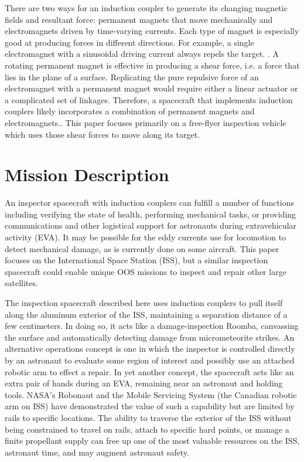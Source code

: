 \documentclass{article}
\begin{document}
There are two ways for an induction coupler to generate its changing magnetic fields and resultant force: permanent magnets that move mechanically and electromagnets driven by time-varying currents. Each type of magnet is especially good at producing forces in different directions. For example, a single electromagnet with a sinusoidal driving current always repels the target. \cite{Reinhardt2012}.  A rotating permanent magnet is effective in producing a shear force, i.e. a force that lies in the plane of a surface.  Replicating the pure repulsive force of an electromagnet with a permanent magnet would require either a linear actuator or a complicated set of linkages. Therefore, a spacecraft that implements induction couplers likely incorporates a combination of permanent magnets and electromagnets..  This paper focuses primarily on a free-flyer inspection vehicle which uses those shear forces to move along its target. \section{Mission Description}

An inspector spacecraft with induction couplers can fulfill a number of functions including verifying the state of health, performing mechanical tasks, or providing communications and other logistical support for astronauts during extravehicular activity (EVA). It may be possible for the eddy currents use for locomotion to detect mechanical damage, as is currently done on some aircraft. \cite{Yang2010}
 This paper focuses on the International Space Station (ISS), but a similar inspection spacecraft could enable unique OOS missions to inspect and repair other large satellites.

The inspection spacecraft described here uses induction couplers to pull itself along the aluminum exterior of the ISS, maintaining a separation distance of a few centimeters. In doing so, it acts like a damage-inspection Roomba,\cite{Tribelhorn2007}
 canvassing the surface and automatically detecting damage from micrometeorite strikes. An alternative operations concept is one in which the inspector is controlled directly by an astronaut to evaluate some region of interest and possibly use an attached robotic arm to effect a repair. In yet another concept, the spacecraft acts like an extra pair of hands during an EVA, remaining near an astronaut and holding tools. NASA’s Robonaut and the Mobile Servicing System (the Canadian robotic arm on ISS) have demonstrated the value of such a capability but are limited by rails to specific locations. \cite{Ambrose2012}
The ability to traverse the exterior of the ISS without being constrained to travel on rails, attach to specific hard points, or manage a finite propellant supply can free up one of the most valuable resources on the ISS, astronaut time, and may augment astronaut safety.
\end{document}
